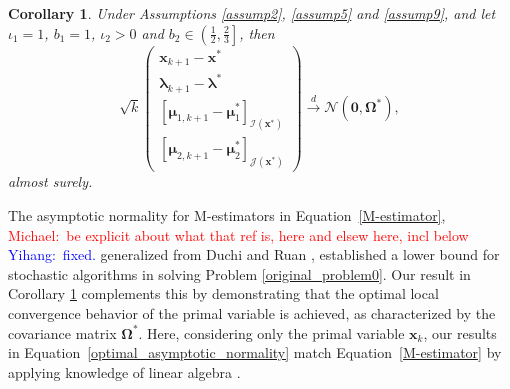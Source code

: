 \documentclass[aos]{imsart}
\numberwithin{equation}{section}
\theoremstyle{plain}
\newtheorem{corollary}{Corollary}
\newcommand{\michael}[1]{\textcolor{red}{Michael:\ #1}}
\newcommand{\yihang}[1]{\textcolor{blue}{Yihang:\ #1}}
\begin{document}
\begin{corollary}
\label{coro_optimality}
     Under Assumptions \ref{assump2}, \ref{assump5} and \ref{assump9}, and let $\iota_1 = 1$, $b_1 = 1$, $\iota_2 > 0$ and $b_2 \in \left( \frac{1}{2}, \frac{2}{3} \right]$, then 
    \begin{equation}
    \label{optimal_asymptotic_normality}
        \sqrt{k} \left( \begin{array}{c}
    \bm{x}_{k+1} - \bm{x}^{*}  \\
    \bm{\lambda}_{k+1} - \bm{\lambda}^{*} \\
    \left[ \bm{\mu}_{1,k+1} - \bm{\mu}_{1}^{*}\right]_{\mathcal{I}(\bm{x}^{*})} \\
    \left[ \bm{\mu}_{2,k+1} - \bm{\mu}_{2}^{*} \right]_{\mathcal{J}(\bm{x}^{*})} 
    \end{array} \right) \stackrel{d}{\longrightarrow} \mathcal{N} \left( \bm{0}, \bm{\Omega}^{*} \right),
    \end{equation}
    almost surely. 
\end{corollary}


The asymptotic normality for M-estimators in Equation~\eqref{M-estimator}, 
\michael{be explicit about what that ref is, here and elsew here, incl below} \yihang{fixed.}
generalized from Duchi and Ruan \cite[Theorem~1]{duchi2021asymptotic}, established a lower bound for stochastic algorithms in solving Problem \eqref{original_problem0}. 
Our result in Corollary \ref{coro_optimality} complements this by demonstrating that the optimal local convergence behavior of the primal variable is achieved, as characterized by the covariance matrix $\bm{\Omega}^{*}$. Here, considering only the primal variable $\bm{x}_k$, our results in Equation~\eqref{optimal_asymptotic_normality} match Equation~\eqref{M-estimator} by applying knowledge of linear algebra \cite[Corollary~2.3]{tian2009inverse}.
\end{document}
